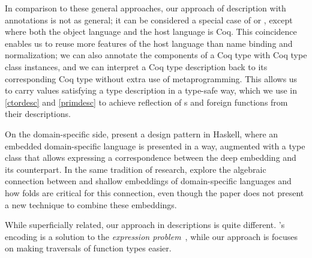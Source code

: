 In comparison to these general approaches, our approach of \reified{} description with annotations is not as general; it can be considered a special case of \citet{mcbride2010outrageous} or \citet{prinz2022deeper}, except where both the \gls{object language} and the \gls{host language} is Coq. This coincidence enables us to reuse more features of the \gls{host language} than name binding and normalization; we can also annotate the components of a Coq type with Coq type class instances, and we can interpret a Coq type description back to its corresponding Coq type without extra use of \gls{metaprogramming}.
This allows us to carry values satisfying a type description in a type-safe way, which we use in \autoref{ctordesc} and \autoref{primdesc} to achieve \gls{reflection} of \constructor{}s and \gls{foreign function}s from their descriptions.

On the domain-specific side,  present a design pattern in Haskell, where an embedded domain-specific language is presented in a  way, augmented with a type class that allows expressing a correspondence between the \gls{deep embedding} and its  counterpart. In the same tradition of research,  explore the algebraic connection between  and \gls{shallow embedding}s of domain-specific languages and how folds are critical for this connection, even though the paper does not present a new technique to combine these embeddings.

While superficially related, our approach in \reified{} descriptions is quite different. \citeauthor{svenningsson2013combining}'s encoding is a solution to the \emph{expression problem}~\cite{wadler1998expression}, while our approach is focuses on making traversals of function types easier.





